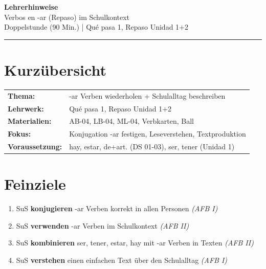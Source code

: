 \documentclass[11pt,a4paper]{article}
\begin{document}
\begin{center}
{\Large\textcolor{fach}{\textbf{Lehrerhinweise}}}\\[0.3cm]
{\large Verbos en -ar (Repaso) im Schulkontext}\\[0.2cm]
{\normalsize Doppelstunde (90 Min.) | Qué pasa 1, Repaso Unidad 1+2}
\end{center}

\vspace{0.5cm}
\hrule
\vspace{0.5cm}

\section*{Kurzübersicht}

\begin{tabular}{ll}
\textbf{Thema:} & -ar Verben wiederholen + Schulalltag beschreiben \\
\textbf{Lehrwerk:} & Qué pasa 1, Repaso Unidad 1+2 \\
\textbf{Materialien:} & AB-04, LB-04, ML-04, Verbkarten, Ball \\
\textbf{Fokus:} & Konjugation -ar festigen, Leseverstehen, Textproduktion \\
\textbf{Voraussetzung:} & hay, estar, de+art. (DS 01-03), ser, tener (Unidad 1) \\
\end{tabular}

\vspace{0.5cm}

\section*{Feinziele}

\begin{enumerate}[label=\textbf{FZ\arabic*:}, leftmargin=2.5em]
    \item SuS \textbf{konjugieren} -ar Verben korrekt in allen Personen \textit{(AFB I)}
    \item SuS \textbf{verwenden} -ar Verben im Schulkontext \textit{(AFB II)}
    \item SuS \textbf{kombinieren} ser, tener, estar, hay mit -ar Verben in Texten \textit{(AFB II)}
    \item SuS \textbf{verstehen} einen einfachen Text über den Schulalltag \textit{(AFB I)}
\end{enumerate}
\end{document}
